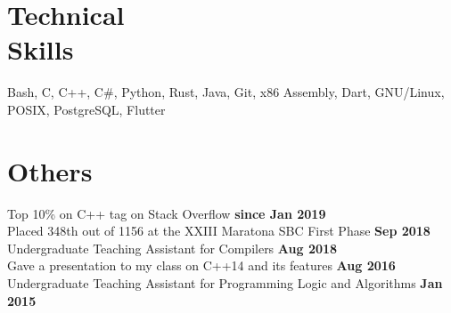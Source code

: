 \documentclass[margin,line]{resume}
\begin{document}
\begin{resume}
    \section{\mysidestyle Technical\\Skills}

    Bash, C, C++, C\#, Python, Rust, Java, Git, x86 Assembly, Dart, GNU/Linux, POSIX, PostgreSQL, Flutter

    \section{\mysidestyle Others}

    Top 10\% on C++ tag on Stack Overflow \hfill \textbf{since Jan 2019}\\
    Placed 348th out of 1156 at the XXIII Maratona SBC First Phase \hfill \textbf{Sep 2018}\\
    Undergraduate Teaching Assistant for Compilers \hfill \textbf{Aug 2018}\\
    Gave a presentation to my class on C++14 and its features \hfill \textbf{Aug 2016}\\
    Undergraduate Teaching Assistant for Programming Logic and Algorithms \hfill \textbf{Jan 2015}\\

\end{resume}
\end{document}
